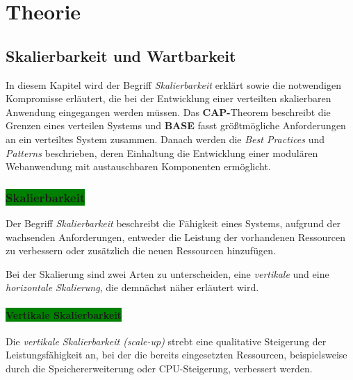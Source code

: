 \chapter{Theorie}
\section{Skalierbarkeit und Wartbarkeit}
In diesem Kapitel wird der Begriff \textit{Skalierbarkeit} erklärt sowie die notwendigen Kompromisse erläutert, die bei der Entwicklung einer verteilten skalierbaren Anwendung eingegangen werden müssen. Das \textbf{CAP-}Theorem beschreibt die Grenzen eines verteilen Systems und \textbf{BASE} fasst größtmögliche Anforderungen an ein verteiltes System zusammen. Danach werden die \textit{Best Practices} und \textit{Patterns} beschrieben, deren Einhaltung die Entwicklung einer modulären Webanwendung mit austauschbaren Komponenten ermöglicht. 

\subsection{\colorbox{green}{Skalierbarkeit}}\label{scale}
Der Begriff \textit{Skalierbarkeit} beschreibt die Fähigkeit eines Systems, aufgrund der wachsenden Anforderungen, entweder die Leistung der vorhandenen Ressourcen zu verbessern oder zusätzlich die neuen Ressourcen hinzufügen. %

Bei der Skalierung sind zwei Arten zu unterscheiden, eine \textit{vertikale} und eine \textit{horizontale Skalierung}, die demnächst näher erläutert wird.

\subsubsection{\colorbox{green}{Vertikale Skalierbarkeit}}

Die \textit{vertikale Skalierbarkeit (scale-up)} strebt eine qualitative Steigerung der Leistungsfähigkeit an, bei der die bereits eingesetzten Ressourcen, beispielsweise durch die Speichererweiterung oder CPU-Steigerung, verbessert werden.


